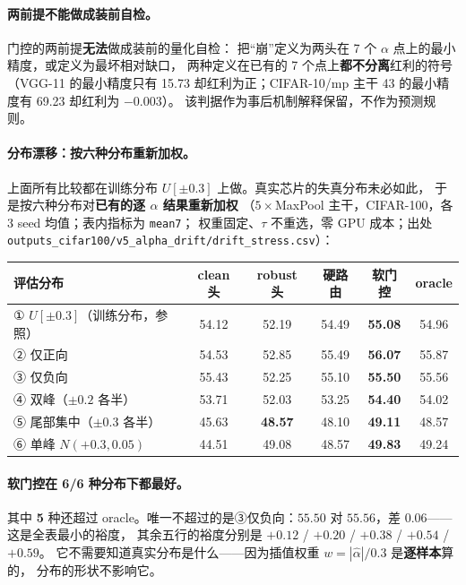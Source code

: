 \documentclass[11pt,a4paper]{ctexart}
\begin{document}
\paragraph{两前提不能做成装前自检。}
门控的两前提\textbf{无法}做成装前的量化自检：
把“崩”定义为两头在 7 个 $\alpha$ 点上的最小精度，或定义为最坏相对缺口，
两种定义在已有的 7 个点上\textbf{都不分离}红利的符号
（VGG-11 的最小精度只有 15.73 却红利为正；CIFAR-10/mp 主干 43 的最小精度有 69.23 却红利为 $-0.003$）。
该判据作为事后机制解释保留，不作为预测规则。

\paragraph{分布漂移：按六种分布重新加权。}
上面所有比较都在训练分布 $U[\pm0.3]$ 上做。真实芯片的失真分布未必如此，
于是按六种分布对\textbf{已有的逐 $\alpha$ 结果重新加权}
（$5\times$MaxPool 主干，CIFAR-100，各 3 seed 均值；表内指标为 \texttt{mean7}；
权重固定、$\tau$ 不重选，零 GPU 成本；出处 \texttt{outputs\_cifar100/v5\_alpha\_drift/drift\_stress.csv}）：

\begin{center}
\small
\begin{tabular}{lccccc}
\toprule
评估分布 & clean 头 & robust 头 & 硬路由 & \textbf{软门控} & oracle \\
\midrule
① $U[\pm0.3]$（训练分布，参照） & 54.12 & 52.19 & 54.49 & \textbf{55.08} & 54.96 \\
② 仅正向 & 54.53 & 52.85 & 55.49 & \textbf{56.07} & 55.87 \\
③ 仅负向 & 55.43 & 52.25 & 55.10 & \textbf{55.50} & 55.56 \\
④ 双峰（$\pm0.2$ 各半） & 53.71 & 52.03 & 53.25 & \textbf{54.40} & 54.02 \\
⑤ 尾部集中（$\pm0.3$ 各半） & 45.63 & \textbf{48.57} & 48.10 & \textbf{49.11} & 48.57 \\
⑥ 单峰 $N(+0.3,0.05)$ & 44.51 & 49.08 & 48.57 & \textbf{49.83} & 49.24 \\
\bottomrule
\end{tabular}
\end{center}

\paragraph{软门控在 6/6 种分布下都最好。}
其中 \textbf{5} 种还超过 oracle。唯一不超过的是③仅负向：$55.50$ 对 $55.56$，差 $0.06$——这是全表最小的裕度，
其余五行的裕度分别是 $+0.12$ / $+0.20$ / $+0.38$ / $+0.54$ / $+0.59$。
它不需要知道真实分布是什么——因为插值权重 $w=|\hat\alpha|/0.3$ 是\textbf{逐样本}算的，
分布的形状不影响它。
\end{document}
